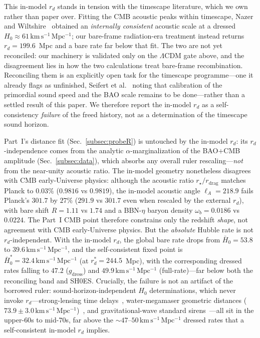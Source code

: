 \documentclass[aps,prd,twocolumn,nofootinbib,superscriptaddress,floatfix]{revtex4-2}
\newcommand{\Ho}{H_{0}}
\newcommand{\Hbaro}{\bar H_{0}}
\newcommand{\kmsmpc}{\,\mathrm{km\,s^{-1}\,Mpc^{-1}}}
\newcommand{\Lcdm}{\Lambda\mathrm{CDM}}
\newcommand{\rd}{r_{d}}
\newcommand{\gdress}{g_{\mathrm{dress}}}
\begin{document}
This in-model $\rd$ stands in tension with the timescape literature, which we own
rather than paper over. Fitting the CMB acoustic peaks within timescape, Nazer and
Wiltshire~\cite{Nazer2015} obtained an \emph{internally consistent} acoustic scale
at a dressed $\Ho\approx61\kmsmpc$; our bare-frame radiation-era treatment instead
returns $\rd=199.6$~Mpc and a bare rate far below that fit. The two are not yet
reconciled: our machinery is validated only on the $\Lcdm$ gate above, and the
disagreement lies in how the two calculations treat bare-frame recombination.
Reconciling them is an explicitly open task for the timescape programme---one it
already flags as unfinished, Seifert et al.~\cite{Seifert2024} noting that
calibration of the primordial sound speed and the BAO scale remains to be
done---rather than a settled result of this paper. We therefore report the in-model
$\rd$ as a self-consistency \emph{failure} of the freed history, not as a
determination of the timescape sound horizon.

Part~I's distance fit (Sec.~\ref{subsec:probeR}) is untouched by the in-model
$\rd$: its $\rd$-independence comes from the analytic $\alpha$-marginalization of
the BAO$+$CMB amplitude (Sec.~\ref{subsec:data}), which absorbs any overall ruler
rescaling---\emph{not} from the near-unity acoustic ratio. The in-model geometry
nonetheless disagrees with CMB early-Universe physics: although the acoustic ratio
$r_\star/r_{\mathrm{drag}}$ matches Planck to $0.03\%$ ($0.9816$ vs $0.9819$), the
in-model acoustic angle $\ell_A=218.9$ fails Planck's $301.7$ by $27\%$ ($291.9$
vs $301.7$ even when rescaled by the external $\rd$), with bare shift $R=1.11$ vs
$1.74$ and a BBN-$\eta$ baryon density $\omega_b=0.0186$ vs $0.0224$. The Part~I
CMB point therefore constrains only the redshift \emph{shape}, not agreement with
CMB early-Universe physics. But the \emph{absolute} Hubble rate is not
$\rd$-independent. With the
in-model $\rd$, the global bare rate drops from $\Hbaro=53.8$ to
$39.6\kmsmpc$, and the self-consistent fixed point is
$\Hbaro^{\ast}=32.4\kmsmpc$ (at $\rd^{\ast}=244.5$~Mpc), with the corresponding
dressed rates falling to $47.2$ ($\gdress$) and $49.9\kmsmpc$ (full-rate)---far
below both the reconciling band and SH0ES. Crucially, the failure is not an
artifact of the borrowed ruler: sound-horizon-independent $\Ho$ determinations,
which never invoke $\rd$---strong-lensing time delays~\cite{TDCOSMO2025},
water-megamaser geometric distances ($73.9\pm3.0\kmsmpc$)~\cite{Pesce2020}, and
gravitational-wave standard sirens~\cite{GWTC3siren}---all sit in the upper-$60$s
to mid-$70$s, far above the $\sim\!47$--$50\kmsmpc$ dressed rates that a self-consistent
in-model $\rd$ implies.
\end{document}
